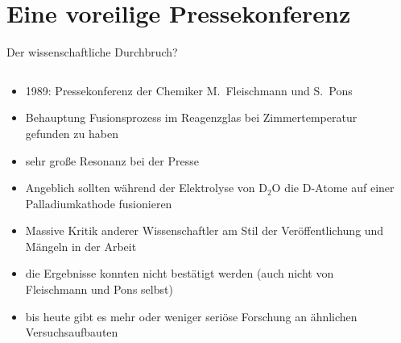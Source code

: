 \section{Eine voreilige Pressekonferenz}

\begin{frame}{Der wissenschaftliche Durchbruch?}
    \pause
    \begin{columns}
        \begin{column}{0.6\textwidth}
            \begin{itemize}
                \item<+-> 1989: Pressekonferenz der Chemiker M.~Fleischmann und S.~Pons
                \item<+-> Behauptung Fusionsprozess im Reagenzglas bei Zimmertemperatur gefunden zu haben
                \item<+-> sehr große Resonanz bei der Presse
                \item<+-> Angeblich sollten während der Elektrolyse von $\mathrm{D_2O}$ die $\mathrm{D}$-Atome auf einer Palladiumkathode fusionieren
                \item<+-> Massive Kritik anderer Wissenschaftler am Stil der Veröffentlichung und Mängeln in der Arbeit
                \item<+-> die Ergebnisse konnten nicht bestätigt werden (auch nicht von Fleischmann und Pons selbst)
                \item<+-> bis heute gibt es mehr oder weniger seriöse Forschung an ähnlichen Versuchsaufbauten
            \end{itemize}
        \end{column}
        \begin{column}{0.4\textwidth}
            \begin{center}
                

\end{center}
\end{column}
\end{columns}
\end{frame}
